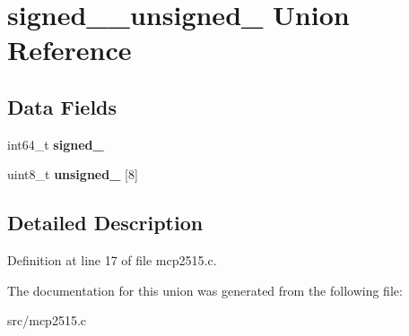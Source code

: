 \hypertarget{unionsigned__64__unsigned__8}{}\section{signed\+\_\+\_\+unsigned\+\_ Union Reference}
\label{unionsigned__64__unsigned__8}
\subsection*{Data Fields}
\begin{DoxyCompactItemize}
\item 
\mbox{\label{unionsigned__64__unsigned__8_a0968ab139966466dc8a59ebca8b8aadc}} 
int64\+\_\+t {\bfseries signed\+\_}
\item 
\mbox{\label{unionsigned__64__unsigned__8_a53b4a4836b045a7427b9e9c3f7d1d0a0}} 
uint8\+\_\+t {\bfseries unsigned\+\_} \mbox{[}8\mbox{]}
\end{DoxyCompactItemize}


\subsection{Detailed Description}


Definition at line 17 of file mcp2515.\+c.



The documentation for this union was generated from the following file\+:\begin{DoxyCompactItemize}
\item 
src/mcp2515.\+c\end{DoxyCompactItemize}
